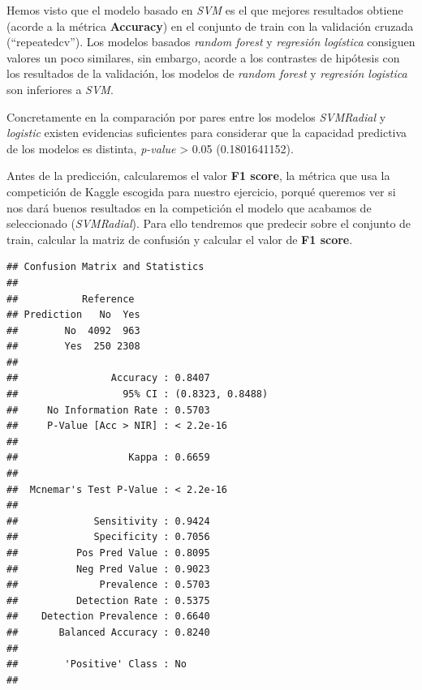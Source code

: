 \documentclass[]{article}
\newenvironment{Shaded}{\begin{snugshade}}{\end{snugshade}}
\newcommand{\DataTypeTok}[1]{\textcolor[rgb]{0.13,0.29,0.53}{#1}}
\newcommand{\KeywordTok}[1]{\textcolor[rgb]{0.13,0.29,0.53}{\textbf{#1}}}
\newcommand{\NormalTok}[1]{#1}
\newcommand{\OperatorTok}[1]{\textcolor[rgb]{0.81,0.36,0.00}{\textbf{#1}}}
\newcommand{\StringTok}[1]{\textcolor[rgb]{0.31,0.60,0.02}{#1}}
\begin{document}
Hemos visto que el modelo basado en \emph{SVM} es el que mejores
resultados obtiene (acorde a la métrica \textbf{Accuracy}) en el
conjunto de train con la validación cruzada (``repeatedcv''). Los
modelos basados \emph{random forest} y \emph{regresión logística}
consiguen valores un poco similares, sin embargo, acorde a los
contrastes de hipótesis con los resultados de la validación, los modelos
de \emph{random forest} y \emph{regresión logistica} son inferiores a
\emph{SVM}.

Concretamente en la comparación por pares entre los modelos
\emph{SVMRadial} y \emph{logistic} existen evidencias suficientes para
considerar que la capacidad predictiva de los modelos es distinta,
\emph{p-value} \textgreater{} 0.05 (0.1801641152).

Antes de la predicción, calcularemos el valor \textbf{F1 score}, la
métrica que usa la competición de Kaggle escogida para nuestro
ejercicio, porqué queremos ver si nos dará buenos resultados en la
competición el modelo que acabamos de seleccionado (\emph{SVMRadial}).
Para ello tendremos que predecir sobre el conjunto de train, calcular la
matriz de confusión y calcular el valor de \textbf{F1 score}.

\begin{Shaded}
\end{Shaded}

\begin{verbatim}
## Confusion Matrix and Statistics
## 
##           Reference
## Prediction   No  Yes
##        No  4092  963
##        Yes  250 2308
##                                           
##                Accuracy : 0.8407          
##                  95% CI : (0.8323, 0.8488)
##     No Information Rate : 0.5703          
##     P-Value [Acc > NIR] : < 2.2e-16       
##                                           
##                   Kappa : 0.6659          
##                                           
##  Mcnemar's Test P-Value : < 2.2e-16       
##                                           
##             Sensitivity : 0.9424          
##             Specificity : 0.7056          
##          Pos Pred Value : 0.8095          
##          Neg Pred Value : 0.9023          
##              Prevalence : 0.5703          
##          Detection Rate : 0.5375          
##    Detection Prevalence : 0.6640          
##       Balanced Accuracy : 0.8240          
##                                           
##        'Positive' Class : No              
## 
\end{verbatim}
\end{document}
